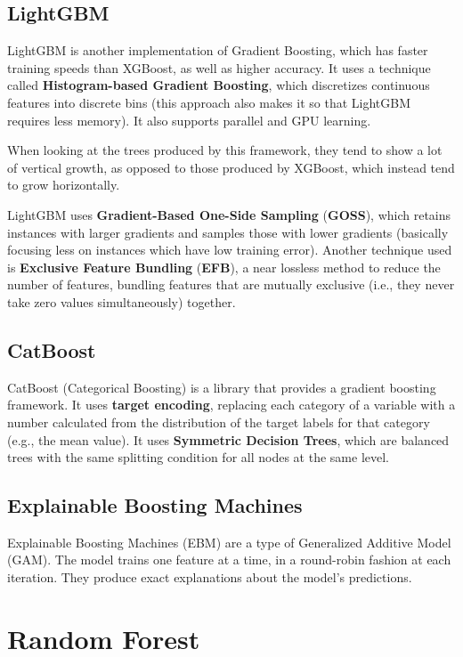 \subsection{LightGBM}

LightGBM is another implementation of Gradient Boosting, which has faster training speeds than XGBoost, as well as higher accuracy. It uses a technique called \textbf{Histogram-based Gradient Boosting}, which discretizes continuous features into discrete bins (this approach also makes it so that LightGBM requires less memory). It also supports parallel and GPU learning.

When looking at the trees produced by this framework, they tend to show a lot of vertical growth, as opposed to those produced by XGBoost, which instead tend to grow horizontally.

LightGBM uses \textbf{Gradient-Based One-Side Sampling} (\textbf{GOSS}), which retains instances with larger gradients and samples those with lower gradients (basically focusing less on instances which have low training error). Another technique used is \textbf{Exclusive Feature Bundling} (\textbf{EFB}), a near lossless method to reduce the number of features, bundling features that are mutually exclusive (i.e., they never take zero values simultaneously) together.

\subsection{CatBoost}

CatBoost (Categorical Boosting) is a library that provides a gradient boosting framework. It uses \textbf{target encoding}, replacing each category of a variable with a number calculated from the distribution of the target labels for that category (e.g., the mean value). It uses \textbf{Symmetric Decision Trees}, which are balanced trees with the same splitting condition for all nodes at the same level.

\subsection{Explainable Boosting Machines}

Explainable Boosting Machines (EBM) are a type of Generalized Additive Model (GAM). The model trains one feature at a time, in a round-robin fashion at each iteration. They produce exact explanations about the model's predictions. 

\section{Random Forest}

